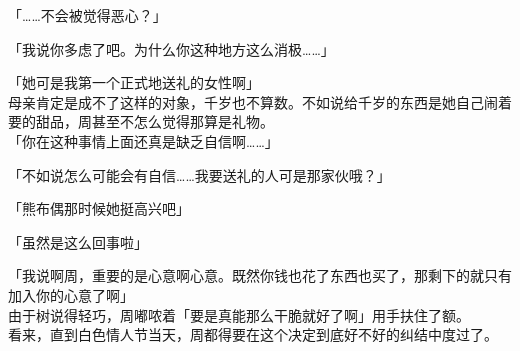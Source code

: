 「……不会被觉得恶心？」

「我说你多虑了吧。为什么你这种地方这么消极……」

「她可是我第一个正式地送礼的女性啊」\\

母亲肯定是成不了这样的对象，千岁也不算数。不如说给千岁的东西是她自己闹着要的甜品，周甚至不怎么觉得那算是礼物。\\

「你在这种事情上面还真是缺乏自信啊……」

「不如说怎么可能会有自信……我要送礼的人可是那家伙哦？」%

「熊布偶那时候她挺高兴吧」

「虽然是这么回事啦」

「我说啊周，重要的是心意啊心意。既然你钱也花了东西也买了，那剩下的就只有加入你的心意了啊」\\

由于树说得轻巧，周嘟哝着「要是真能那么干脆就好了啊」用手扶住了额。\\

看来，直到白色情人节当天，周都得要在这个决定到底好不好的纠结中度过了。
